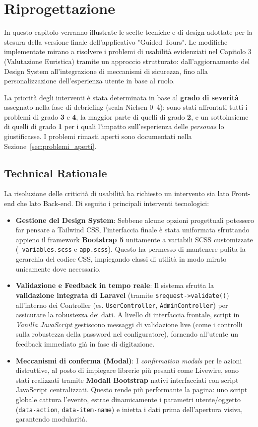 \chapter{Riprogettazione}
\label{ch:riprogettazione}

In questo capitolo verranno illustrate le scelte tecniche e di design adottate per la stesura della versione finale dell'applicativo "Guided Tours". Le modifiche implementate mirano a risolvere i problemi di usabilità evidenziati nel Capitolo 3 (Valutazione Euristica) tramite un approccio strutturato: dall'aggiornamento del Design System all'integrazione di meccanismi di sicurezza, fino alla personalizzazione dell'esperienza utente in base al ruolo.

La priorità degli interventi è stata determinata in base al \textbf{grado di severità} assegnato nella fase di debriefing (scala Nielsen 0--4): sono stati affrontati tutti i problemi di grado \textbf{3} e \textbf{4}, la maggior parte di quelli di grado \textbf{2}, e un sottoinsieme di quelli di grado \textbf{1} per i quali l'impatto sull'esperienza delle \textit{personas} lo giustificasse. I problemi rimasti aperti sono documentati nella Sezione~\ref{sec:problemi_aperti}.

\section{Technical Rationale}
La risoluzione delle criticità di usabilità ha richiesto un intervento sia lato Front-end che lato Back-end. Di seguito i principali interventi tecnologici:
\begin{itemize}
    \item \textbf{Gestione del Design System}: Sebbene alcune opzioni progettuali potessero far pensare a Tailwind CSS, l'interfaccia finale è stata uniformata sfruttando appieno il framework \textbf{Bootstrap 5} unitamente a variabili SCSS customizzate (\texttt{\_variables.scss} e \texttt{app.scss}). Questo ha permesso di mantenere pulita la gerarchia del codice CSS, impiegando classi di utilità in modo mirato unicamente dove necessario.
    \item \textbf{Validazione e Feedback in tempo reale}: Il sistema sfrutta la \textbf{validazione integrata di Laravel} (tramite \texttt{\$request->validate()}) all'interno dei Controller (es. \texttt{UserController}, \texttt{AdminController}) per assicurare la robustezza dei dati. A livello di interfaccia frontale, script in \textit{Vanilla JavaScript} gestiscono messaggi di validazione live (come i controlli sulla robustezza della password nel configuratore), fornendo all'utente un feedback immediato già in fase di digitazione.
    \item \textbf{Meccanismi di conferma (Modal)}: I \textit{confirmation modals} per le azioni distruttive, al posto di impiegare librerie più pesanti come Livewire, sono stati realizzati tramite \textbf{Modali Bootstrap} nativi interfacciati con script JavaScript centralizzati. Questo rende più performante la pagina: uno script globale cattura l'evento, estrae dinamicamente i parametri utente/oggetto (\texttt{data-action}, \texttt{data-item-name}) e inietta i dati prima dell'apertura visiva, garantendo modularità.
\end{itemize}

